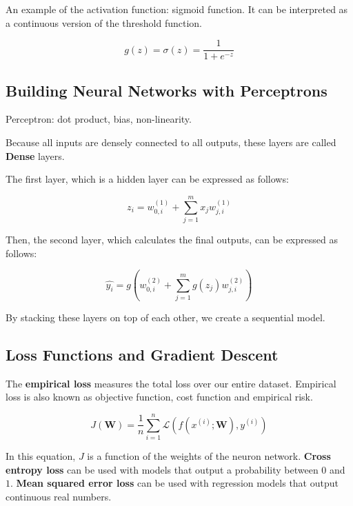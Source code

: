 \documentclass[12pt, a4paper, oneside]{article}
\begin{document}
An example of the activation function: sigmoid function. It can be interpreted as a continuous version of the threshold function.

\begin{equation*}
    g(z)=\sigma(z)=\frac{1}{1+e^{-z}}
\end{equation*}

\subsection{Building Neural Networks with Perceptrons}

Perceptron: dot product, bias, non-linearity.

Because all inputs are densely connected to all outputs, these layers are called \textbf{Dense} layers.

The first layer, which is a hidden layer can be expressed as follows:

\begin{equation*}
    z_{i}=w_{0,i}^{(1)}+\sum_{j=1}^{m}x_{j}w_{j,i}^{(1)}
\end{equation*}

Then, the second layer, which calculates the final outputs, can be expressed as follows:

\begin{equation*}
    \hat{y_{i}}=g(w_{0,i}^{(2)}+\sum_{j=1}^{m}g(z_{j})w_{j,i}^{(2)})
\end{equation*}

By stacking these layers on top of each other, we create a sequential model.

\subsection{Loss Functions and Gradient Descent}

The \textbf{empirical loss} measures the total loss over our entire dataset. Empirical loss is also known as objective function, cost function and empirical risk.

\begin{equation*}
    J(\bm{W})=\frac{1}{n}\sum_{i=1}^{n}\mathcal{L}(f(x^{(i)};\bm{W}),y^{(i)})
\end{equation*}

In this equation, $J$ is a function of the weights of the neuron network. \textbf{Cross entropy loss} can be used with models that output a probability between $0$ and $1$. \textbf{Mean squared error loss} can be used with regression models that output continuous real numbers.
\end{document}
